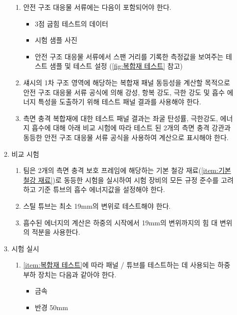 \documentclass[final,a4paper,10pt]{report}
\begin{document}
\begin{enumerate}
\begin{enumerate}
\begin{enumerate}
          \item 안전 구조 대응물 서류에는 다음이 포함되어야 한다.
            \begin{itemize}
              \item 3점 굽힘 테스트의 데이터
              \item 시험 샘플 사진
              \item 안전 구조 대응물 서류에서 스팬 거리를 기록한 측정값을 보여주는 테스트 샘플 및 테스트 설정 (\cref{fig:복합재 테스트} 참고)
            \end{itemize}
            
            
          \item 섀시의 1차 구조 영역에 해당하는 복합재 패널 동등성을 계산할 목적으로 안전 구조 대응물 서류 공식에 의해 강성, 항복 강도, 극한 강도 및 흡수 에너지 특성을 도출하기 위해 테스트 패널 결과를 사용해야 한다.
          \item 측면 충격 복합재에 대한 테스트 패널 결과는 좌굴 탄성률, 극한강도, 에너지 흡수에 대해 아래 비교 시험에 따라 테스트 된 2개의 측면 충격 강관과 동등한 안전 구조 대응물 서류 공식을 사용하여 계산으로 표시해야 한다.
        \end{enumerate}

      \item 비교 시험
        \begin{enumerate}
          \item 팀은 2개의 측면 충격 보호 프레임에 해당하는 기본 철강 재료(\cref{item:기본 철강 재료})로 동등한 시험을 실시하여 시험 장비의 모든 규정 준수를 고려하고 기준 튜브의 흡수 에너지값을 설정해야 한다.
          \item 스틸 튜브는 최소 19mm의 변위로 테스트해야 한다.
          \item 흡수된 에너지의 계산은 하중의 시작에서 19mm의 변위까지의 힘 대 변위의 적분을 사용한다.
        \end{enumerate}

      \item 시험 실시
        \begin{enumerate}
          \item \cref{item:복합재 테스트}에 따라 패널 / 튜브를 테스트하는 데 사용되는 하중 부하 장치는 다음과 같아야 한다.
            \begin{itemize}
                \item 금속
                \item 반경 50mm
            \end{itemize}
            

\end{enumerate}
\end{enumerate}
\end{enumerate}
\end{document}
